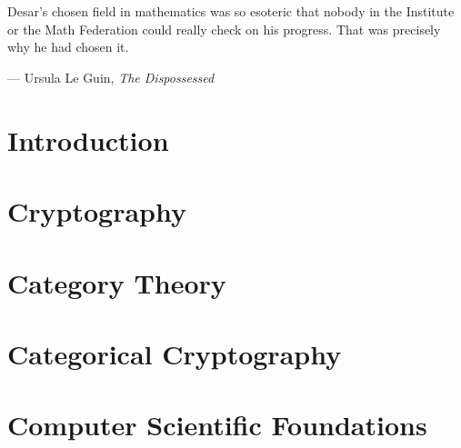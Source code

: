\documentclass[12pt,twoside]{reedthesis}
\begin{document}



\tableofcontents

\chapter*{}
\begin{dedication}
  Desar's chosen field in mathematics was so esoteric that nobody in the
  Institute or the Math Federation could really check on his progress. That was
  precisely why he had chosen it.

  --- Ursula Le Guin, \emph{The Dispossessed}
\end{dedication}



\mainmatter%
\pagestyle{fancyplain} %

\chapter*{Introduction}


\chapter{Cryptography}
\label{chap:cryptography}


\chapter{Category Theory}
\label{chap:category-theory}


\chapter{Categorical Cryptography}
\label{chap:categorical-cryptography}


\appendix
\chapter{Computer Scientific Foundations}
\label{chap:cs-theory}


\backmatter{}
\nocite{*}
\printbibliography


\end{document}

